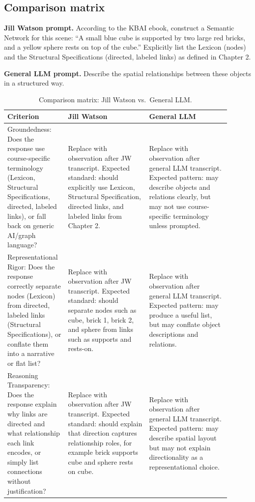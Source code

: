 \documentclass[
	letterpaper, %
]{jdf}
\begin{document}
\subsection{Comparison matrix}

\textbf{Jill Watson prompt.} According to the KBAI ebook, construct a Semantic Network for this scene: ``A small blue cube is supported by two large red bricks, and a yellow sphere rests on top of the cube.'' Explicitly list the Lexicon (nodes) and the Structural Specifications (directed, labeled links) as defined in Chapter 2.

\textbf{General LLM prompt.} Describe the spatial relationships between these objects in a structured way.

\begin{table}[h]
	\caption{Comparison matrix: Jill Watson vs.\ General LLM.}
	\small
	\centering
	\begin{tabular}{L{0.22\linewidth} L{0.34\linewidth} L{0.34\linewidth}}
		\textbf{Criterion} & \textbf{Jill Watson} & \textbf{General LLM} \\
		\toprule[0.5pt]
		Groundedness: Does the response use course-specific terminology (Lexicon, Structural Specifications, directed, labeled links), or fall back on generic AI/graph language? & Replace with observation after JW transcript. Expected standard: should explicitly use Lexicon, Structural Specification, directed links, and labeled links from Chapter 2. & Replace with observation after general LLM transcript. Expected pattern: may describe objects and relations clearly, but may not use course-specific terminology unless prompted. \\
		\midrule
		Representational Rigor: Does the response correctly separate nodes (Lexicon) from directed, labeled links (Structural Specifications), or conflate them into a narrative or flat list? & Replace with observation after JW transcript. Expected standard: should separate nodes such as cube, brick 1, brick 2, and sphere from links such as supports and rests-on. & Replace with observation after general LLM transcript. Expected pattern: may produce a useful list, but may conflate object descriptions and relations. \\
		\midrule
		Reasoning Transparency: Does the response explain why links are directed and what relationship each link encodes, or simply list connections without justification? & Replace with observation after JW transcript. Expected standard: should explain that direction captures relationship roles, for example brick supports cube and sphere rests on cube. & Replace with observation after general LLM transcript. Expected pattern: may describe spatial layout but may not explain directionality as a representational choice. \\
	\end{tabular}
\end{table}
\end{document}
